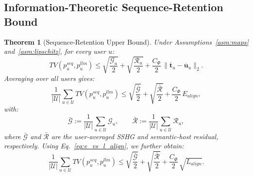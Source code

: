 ﻿\documentclass{article}
\newtheorem{theorem}{Theorem}[section]
\begin{document}
\subsection{Information-Theoretic Sequence-Retention Bound}
\label{app:main_theorem}

\begin{theorem}[Sequence-Retention Upper Bound]
\label{thm:retention}
Under Assumptions~\ref{asm:maps} and~\ref{asm:lipschitz}, for every user $u$:
\begin{equation}
TV(p_u^{seq},p_u^{llm})
\le
\sqrt{\frac{\mathcal G_u}{2}}
+
\sqrt{\frac{\mathcal R_u}{2}}
+
\frac{C_\Phi}{2}\,\|\overline{\mathbf{t}}_u-\overline{\mathbf{u}}_u\|_2.
\label{eq:user_bound}
\end{equation}
Averaging over all users gives:
\begin{equation}
\frac{1}{|\mathcal U|}\sum_{u\in\mathcal U}TV(p_u^{seq},p_u^{llm})
\le
\sqrt{\frac{\bar{\mathcal G}}{2}}
+
\sqrt{\frac{\bar{\mathcal R}}{2}}
+
\frac{C_\Phi}{2}\,E_{align},
\label{eq:avg_bound}
\end{equation}
with:
\begin{equation}
\bar{\mathcal G}
:=
\frac{1}{|\mathcal U|}\sum_{u\in\mathcal U}\mathcal G_u,
\qquad
\bar{\mathcal R}
:=
\frac{1}{|\mathcal U|}\sum_{u\in\mathcal U}\mathcal R_u,
\label{eq:avg_sr}
\end{equation}
where $\bar{\mathcal G}$ and $\bar{\mathcal R}$ are the user-averaged SSHG and semantic-host residual, respectively.
Using Eq.~\eqref{eq:e_vs_l_align}, we further obtain:
\begin{equation}
\frac{1}{|\mathcal U|}\sum_{u\in\mathcal U}TV(p_u^{seq},p_u^{llm})
\le
\sqrt{\frac{\bar{\mathcal G}}{2}}
+
\sqrt{\frac{\bar{\mathcal R}}{2}}
+
\frac{C_\Phi}{2}\,\sqrt{L_{align}}.
\label{eq:avg_bound_lalign}
\end{equation}
\end{theorem}
\end{document}
